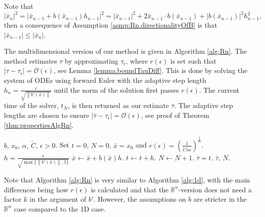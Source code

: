 \documentclass[a4paper, oneside, reqno]{amsart}
\newcommand{\abs}[1]{\left\lvert#1\right\rvert}
\newcommand{\norm}[1]{\left\|#1\right\|}
\newcommand{\R}{\mathbb{R}}
\theoremstyle{remark}
\begin{document}
\begin{remark}[Monotonicity of \(\abs{\bar x_n}\)]
    Note that 
    \[\abs{\bar x_{n}}^2 = \abs{\bar x_{n-1} + b(\bar x_{n-1})h_{n-1}}^2 = \abs{\bar x_{n-1}}^2 + 2\bar x_{n-1} \cdot b(\bar x_{n-1})+ \abs{b(\bar x_{n-1})}^2h_{n-1}^2,\]
    then a consequence of Assumption \ref{asmp:Rn.directionalityOfB} is that
    \(\abs{\bar x_{n-1}}\leq\abs{\bar x_{n}}\).
\end{remark}

The multidimensional version of our method is given in Algorithm \ref{alg:Rn}. 
The method estimates \(\tau\) by approximating \(\tau_\epsilon\), where \(r(\epsilon)\) is set such that \(\abs{\tau-\tau_\epsilon} = \mathcal{O}(\epsilon)\), see Lemma \ref{lemma:boundTauDiff}. 
This is done by solving the system of ODEs using forward Euler with the adaptive step length \(h_n = \frac{\epsilon}{\sqrt{\norm{b'(\bar x)}}}\) until the norm of the solution first passes \(r(\epsilon)\). 
The current time of the solver, \(t_N\), is then returned as our estimate \(\bar\tau\). The adaptive step lengths are chosen to ensure \(\abs{\bar\tau - \tau_\epsilon} = \mathcal{O}(\epsilon)\), see proof of Theorem \ref{thm:propertiesAlgRn}.
\begin{algorithm}
    \caption{Estimating blow-up time of ODE in \(\R^n\)}
    \label{alg:Rn}
    \begin{algorithmic}[1]
        \Require \(b,\, x_0,\,\alpha,\, \check{C},\,\epsilon > 0\).
        \State Set \(t = 0,\, N=0,\,  \bar x = x_0\) and \(r(\epsilon) = \left(\frac{1}{\check{C}\alpha\epsilon}\right)^{\frac{1}{\alpha}}\).
        \While{\(\abs{\bar x} \leq r(\epsilon)\)}
            \State \(h = \frac{\epsilon}{\sqrt{\max\{\norm{b'(\bar x)}, 1\}}}\)
            \State \(\bar x \leftarrow \bar x + b(\bar x)h\).
            \State \(t \leftarrow t + h\).
            \State \(N \leftarrow N+1\).
        \EndWhile
        \State \(\bar\tau = t\).
        \Ensure \(\bar\tau,\,N\).
    \end{algorithmic}
\end{algorithm}

Note that Algorithm \ref{alg:Rn} is very similar to Algorithm \ref{alg:1d}, with the main differences being how \(r(\epsilon)\) is calculated and that the \(\R^n\)-version does not need a factor \(k\) in the argument of \(b'\). However, the assumptions on \(b\) are stricter in the \(\R^n\) case compared to the 1D case.
\end{document}
